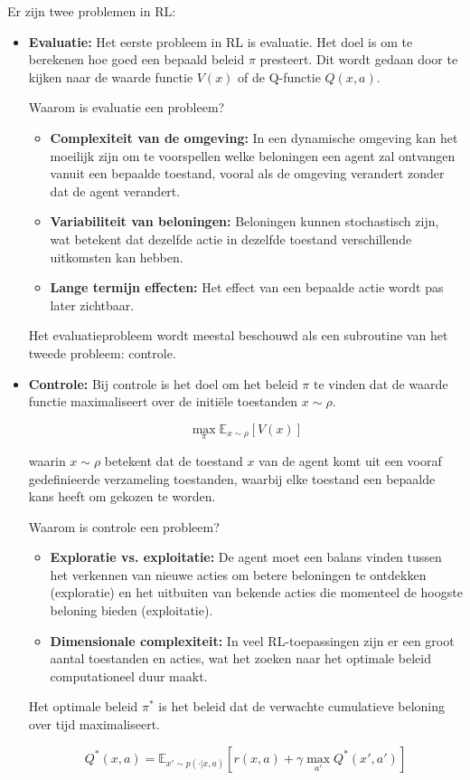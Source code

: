 \documentclass[a4paper,12pt]{report}
\begin{document}
Er zijn twee problemen in RL:
\begin{itemize}
    \item \textbf{Evaluatie:} Het eerste probleem in RL is evaluatie. Het doel is om te berekenen hoe goed een bepaald beleid \(\pi\) presteert. Dit wordt gedaan door te kijken naar de waarde functie \(V(x)\) of de Q-functie \(Q(x,a)\).
    
    Waarom is evaluatie een probleem?
    \begin{itemize}
        \item \textbf{Complexiteit van de omgeving:} In een dynamische omgeving kan het moeilijk zijn om te voorspellen welke beloningen een agent zal ontvangen vanuit een bepaalde toestand, vooral als de omgeving verandert zonder dat de agent verandert.
        \item \textbf{Variabiliteit van beloningen:} Beloningen kunnen stochastisch zijn, wat betekent dat dezelfde actie in dezelfde toestand verschillende uitkomsten kan hebben.
        \item \textbf{Lange termijn effecten:} Het effect van een bepaalde actie wordt pas later zichtbaar.
    \end{itemize}
    
    Het evaluatieprobleem wordt meestal beschouwd als een subroutine van het tweede probleem: controle.
    
    \item \textbf{Controle:} Bij controle is het doel om het beleid \(\pi\) te vinden dat de waarde functie maximaliseert over de initiële toestanden \(x \sim \rho\).
    
    \[
    \max_{\pi} \mathbb{E}_{x \sim \rho}[V(x)]
    \]
    
    \noindent waarin \(x \sim \rho\) betekent dat de toestand \(x\) van de agent komt uit een vooraf gedefinieerde verzameling toestanden, waarbij elke toestand een bepaalde kans heeft om gekozen te worden.
    
    Waarom is controle een probleem?
    \begin{itemize}
        \item \textbf{Exploratie vs. exploitatie:} De agent moet een balans vinden tussen het verkennen van nieuwe acties om betere beloningen te ontdekken (exploratie) en het uitbuiten van bekende acties die momenteel de hoogste beloning bieden (exploitatie).
        \item \textbf{Dimensionale complexiteit:} In veel RL-toepassingen zijn er een groot aantal toestanden en acties, wat het zoeken naar het optimale beleid computationeel duur maakt.
    \end{itemize}
    
    Het optimale beleid \(\pi^*\) is het beleid dat de verwachte cumulatieve beloning over tijd maximaliseert.
    
    \[
    Q^*(x,a) = \mathbb{E}_{x' \sim p(\cdot|x,a)}\left[r(x,a) + \gamma \max_{a'} Q^*(x',a')\right]
    \]
\end{itemize}
\end{document}
